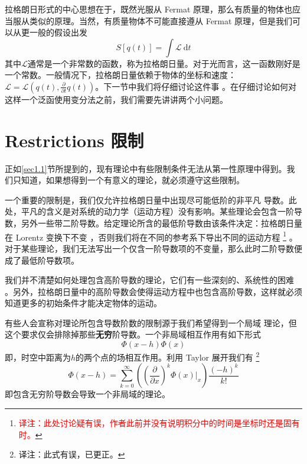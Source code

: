 拉格朗日形式的中心思想在于，既然光服从 Fermat 原理，那么有质量的物体也应当服从类似的原理。当然，有质量物体不可能直接遵从 Fermat 原理，但是我们可以从更一般的假设出发
\[
S[q(t)]=\int {\mathcal L}~{\mathrm d}t
\]
其中\(\mathcal L\)通常是一个非常数的函数，称为拉格朗日量。对于光而言，这一函数刚好是一个常数。一般情况下，拉格朗日量依赖于物体的坐标和速度：\({\mathcal L}={\mathcal L}(q(t),\frac{\partial}{\partial t} q(t))\)。下一节中我们将仔细讨论这件事%
%
。在仔细讨论如何对这样一个泛函使用变分法之前，我们需要先讲讲两个小问题。

\section[限制]{Restrictions \quad 限制}\label{sec4.2}
正如\ref{sec1.1}节所提到的，现有理论中有些限制条件无法从第一性原理中得到。我们只知道，如果想得到一个有意义的理论，就必须遵守这些限制。

一个重要的限制是，我们仅允许拉格朗日量中出现尽可能低阶的非平凡%
导数。此处，平凡的含义是对系统的动力学（运动方程）没有影响。某些理论会包含一阶导数，另外一些带二阶导数。给定理论所含的最低阶导数由该条件决定：拉格朗日量在 Lorentz 变换下不变%
%
，否则我们将在不同的参考系下导出不同的运动方程%
\footnote{\textcolor{red}{译注：此处讨论疑有误，作者此前并没有说明积分中的时间是坐标时还是固有时。}}%
。对于某些理论，我们无法写出一个仅含一阶导数项的不变量，那么此时二阶导数便成了最低阶导数项。

我们并不清楚如何处理包含高阶导数的理论，它们有一些深刻的、系统性的困难%
%
。另外，拉格朗日量中的高阶导数会使得运动方程中也包含高阶导数，这样就必须知道更多的初始条件才能决定物体的运动。

有些人会宣称对理论所包含导数阶数的限制源于我们希望得到一个局域%
%
理论，但这个要求仅会排除掉那些{\bfseries 无穷}阶导数。一个非局域相互作用有如下形式%
\begin{equation}
\label{equ4.1}
\Phi(x-h)\Phi(x)
\end{equation}
即，时空中距离为\(h\)的两个点的场相互作用。利用 Taylor 展开我们有%
\footnote{译注：此式有误，已更正。}
\begin{equation}
\label{equ4.2}
\Phi(x-h) = \sum\limits_{k=0}^{\infty}\left(\left(\frac{\partial}{\partial x}\right)^k\left.\Phi(x)\right|_{x}\right) \frac{(-h)^k}{k!}
\end{equation}
即包含无穷阶导数会导致一个非局域的理论。

